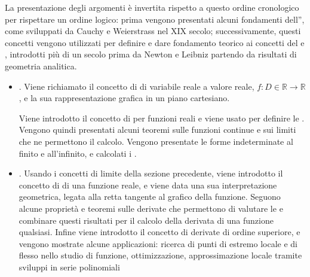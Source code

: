 \documentclass[letterpaper,10pt,italian]{jupyterBook}
\begin{document}
\sphinxAtStartPar
La presentazione degli argomenti è invertita rispetto a questo ordine cronologico per rispettare un ordine logico: prima vengono presentati alcuni fondamenti dell”, come sviluppati da Cauchy e Weierstrass nel XIX secolo; successivamente, questi concetti vengono utilizzati per definire e dare fondamento teorico ai concetti del  e , introdotti più di un secolo prima da Newton e Leibniz partendo da risultati di geometria analitica.



\sphinxAtStartPar
{}
\begin{itemize}
\item {} 
\sphinxAtStartPar
{\hyperref[\detokenize{ch/infinitesimal_calculus/analysis:infinitesimal-calculus-analysis}]{}}. Viene richiamato il concetto di  di variabile reale a valore reale, \(f: D \in \mathbb{R} \rightarrow \mathbb{R}\), e la sua rappresentazione grafica in un piano cartesiano.

\sphinxAtStartPar
Viene introdotto il concetto di  per funzioni reali e viene usato per definire le . Vengono quindi presentati alcuni teoremi sulle funzioni continue e sui limiti che ne permettono il calcolo. Vengono presentate le forme indeterminate al finito e all’infinito, e calcolati i .

\item {} 
\sphinxAtStartPar
{\hyperref[\detokenize{ch/infinitesimal_calculus/derivatives:infinitesimal-calculus-derivatives}]{}}. Usando i concetti di limite della sezione precedente, viene introdotto il concetto di  di una funzione reale, e viene data una sua interpretazione geometrica, legata alla retta tangente al grafico della funzione. Seguono alcune proprietà e teoremi sulle derivate che permettono di valutare le  e combinare questi risultati per il calcolo della derivata di una funzione qualsiasi. Infine viene introdotto il concetto di derivate di ordine superiore, e vengono mostrate alcune applicazioni: ricerca di punti di estremo locale e di flesso nello studio di funzione, ottimizzazione, approssimazione locale tramite sviluppi in serie polinomiali


\end{itemize}
\end{document}
